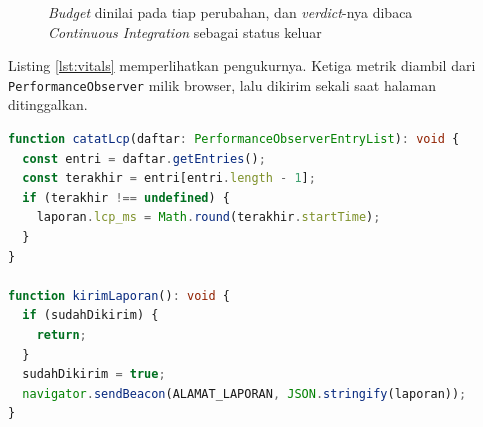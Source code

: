 \begin{figure}[!htb]
  \centering
  \caption{\textit{Budget} dinilai pada tiap perubahan, dan \textit{verdict}-nya dibaca
           \textit{Continuous Integration} sebagai status keluar}
  \label{fig:gate}
\end{figure}

Listing \ref{lst:vitals} memperlihatkan pengukurnya. Ketiga metrik diambil
dari \texttt{PerformanceObserver} milik browser, lalu dikirim sekali saat
halaman ditinggalkan.

\begin{lstlisting}[language=TypeScript, caption={Pengukur Core Web Vitals pada kunjungan nyata, tersedia di \berkas{sources/chapter05/web-vitals.ts}}, label={lst:vitals}]
function catatLcp(daftar: PerformanceObserverEntryList): void {
  const entri = daftar.getEntries();
  const terakhir = entri[entri.length - 1];
  if (terakhir !== undefined) {
    laporan.lcp_ms = Math.round(terakhir.startTime);
  }
}

function kirimLaporan(): void {
  if (sudahDikirim) {
    return;
  }
  sudahDikirim = true;
  navigator.sendBeacon(ALAMAT_LAPORAN, JSON.stringify(laporan));
}
\end{lstlisting}

